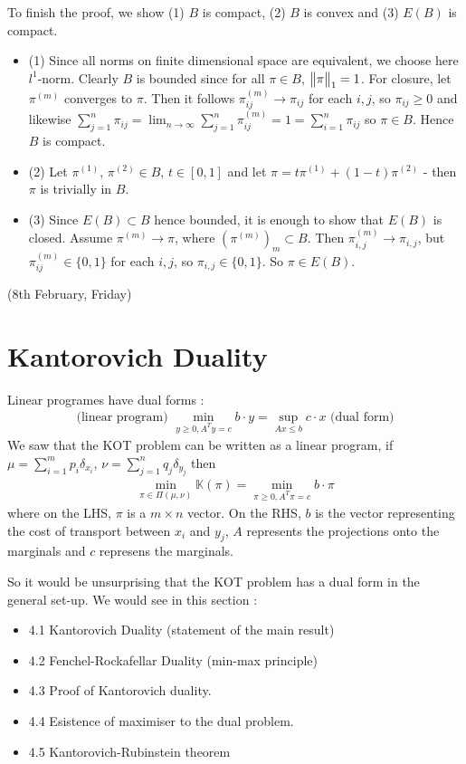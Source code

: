 \documentclass[12pt,a4paper]{article}
\newenvironment{proof}
{\begin{changemargin}{1cm}{0.5cm} 
	}%
	{\end{changemargin}
}
\renewenvironment{i}
{\begin{itemize} 
	}%
	{\end{itemize}
}
\begin{document}
\begin{proof}
To finish the proof, we show (1) $B$ is compact, (2) $B$ is convex and (3) $E(B)$ is compact.
\begin{i}
\item[(1)] Since all norms on finite dimensional space are equivalent, we choose here $l^1$-norm. Clearly $B$ is bounded since for all $\pi \in B$, $\bigl\lVert\pi\bigr\rVert_{1}=1$. For closure, let $\pi^{(m)}$ converges to $\pi$. Then it follows $\pi_{ij}^{(m)} \rightarrow \pi_{ij}$ for each $i,j$, so $\pi_{ij}\geq 0$ and likewise $\sum_{j=1}^n \pi_{ij} = \lim_{n\rightarrow \infty} \sum_{j=1}^n \pi_{ij}^{(m)} =1 = \sum_{i=1}^n \pi_{ij}$ so $\pi \in B$. Hence $B$ is compact.
\item[(2)] Let $\pi^{(1)}$, $\pi^{(2)} \in B$, $t \in [0,1]$ and let $\pi = t\pi^{(1)} + (1-t) \pi^{(2)}$ - then $\pi$ is trivially in $B$.
\item[(3)] Since $E(B) \subset B$ hence bounded, it is enough to show that $E(B)$ is closed. Assume $\pi^{(m)} \rightarrow \pi$, where $(\pi^{(m)})_m \subset B$. Then $\pi^{(m)}_{i,j} \rightarrow \pi_{i,j}$, but $\pi^{(m)}_{ij} \in \{0,1\}$ for each $i,j$, so $\pi_{i,j} \in \{0,1\}$. So $\pi \in E(B)$. 
\end{i}
\eop
\end{proof}
\s

\newday

(8th February, Friday)
\s

\section{Kantorovich Duality}

Linear programes have dual forms :
\begin{align*}
\text{(linear program)} \,\, \min_{y\geq 0, A^T y=c} b\cdot y = \sup_{Ax \leq b} c\cdot x \,\, \text{(dual form)}
\end{align*}
We saw that the KOT problem can be written as a linear program, if $\mu = \sum_{i=1}^m p_i \delta_{x_i}$, $\nu = \sum_{j=1}^n q_j \delta_{y_j}$ then
\begin{align*}
\min_{\pi \in \Pi(\mu, \nu)} \mathbb{K} (\pi) = \min_{ \pi \geq 0, A^T \pi =c } b\cdot \pi
\end{align*}
where on the LHS, $\pi$ is a $m\times n$ vector. On the RHS, $b$ is the vector representing the cost of transport between $x_i$ and $y_j$, $A$ represents the projections onto the marginals and $c$ represens the marginals.
\s

So it would be unsurprising that the KOT problem has a dual form in the general set-up. We would see in this section :
\begin{i}
\item[4.1] Kantorovich Duality (statement of the main result)
\item[4.2] Fenchel-Rockafellar Duality (min-max principle)
\item[4.3] Proof of Kantorovich duality.
\item[4.4] Esistence of maximiser to the dual problem.
\item[4.5] Kantorovich-Rubinstein theorem
\end{i}
\end{document}

